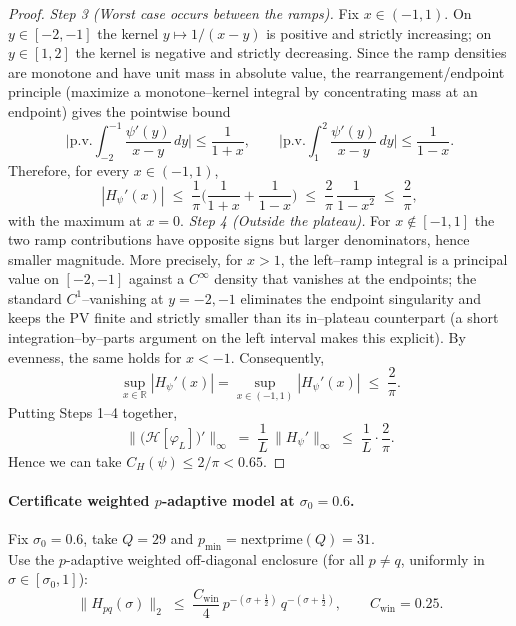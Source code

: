 \documentclass[11pt]{article}
\newif\ifshownumerics
\theoremstyle{definition}
\theoremstyle{remark}
\theoremstyle{definition}
\begin{document}
\begin{proof}
\smallskip
\textit{Step 3 (Worst case occurs between the ramps).} Fix $x\in(-1,1)$.  On $y\in[-2,-1]$ the kernel $y\mapsto 1/(x-y)$ is positive and strictly increasing; on $y\in[1,2]$ the kernel is negative and strictly decreasing.  Since the ramp densities are monotone and have unit mass in absolute value, the rearrangement/endpoint principle (maximize a monotone–kernel integral by concentrating mass at an endpoint) gives the pointwise bound
\[
  \Big|\mathrm{p.v.}\!\int_{-2}^{-1}\frac{\psi'(y)}{x-y}\,dy\Big|
  \le \frac{1}{1+x},\qquad
  \Big|\mathrm{p.v.}\!\int_{1}^{2}\frac{\psi'(y)}{x-y}\,dy\Big|
  \le \frac{1}{1-x}.
\]
Therefore, for every $x\in(-1,1)$,
\[
  |H_\psi'(x)| \;\le\; \frac{1}{\pi}\Big(\frac{1}{1+x}+\frac{1}{1-x}\Big)
  \;\le\; \frac{2}{\pi}\,\frac{1}{1-x^2}
  \;\le\; \frac{2}{\pi},
\]
with the maximum at $x=0$.
\smallskip
\textit{Step 4 (Outside the plateau).} For $x\notin[-1,1]$ the two ramp contributions have opposite signs but larger denominators, hence smaller magnitude. More precisely, for $x>1$, the left–ramp integral is a principal value on $[-2,-1]$ against a $C^\infty$ density that vanishes at the endpoints; the standard $C^1$–vanishing at $y=-2,-1$ eliminates the endpoint singularity and keeps the PV finite and strictly smaller than its in–plateau counterpart (a short integration–by–parts argument on the left interval makes this explicit). By evenness, the same holds for $x<-1$.  Consequently,
\[
  \sup_{x\in\mathbb R}|H_\psi'(x)|=\sup_{x\in(-1,1)}|H_\psi'(x)|\;\le\;\frac{2}{\pi}.
\]
Putting Steps 1–4 together,
\[
  \big\|\big(\mathcal H[\varphi_L]\big)'\big\|_\infty
  \;=\;\frac{1}{L}\,\|H_\psi'\|_\infty
  \;\le\;\frac{1}{L}\cdot\frac{2}{\pi}.
\]
Hence we can take $C_H(\psi)\le 2/\pi < 0.65$.
\end{proof}


\ifshownumerics
\paragraph*{Certificate \textemdash{} weighted \(p\)-adaptive model at \(\sigma_0=0.6\).}
Fix \(\sigma_0=0.6\), take \(Q=29\) and \(p_{\min}=\mathrm{nextprime}(Q)=31\).\\
Use the \(p\)-adaptive weighted off-diagonal enclosure (for all \(p\neq q\), uniformly in \(\sigma\in[\sigma_0,1]\)):
\[
\|H_{pq}(\sigma)\|_2 \;\le\; \frac{C_{\mathrm{win}}}{4}\, p^{-(\sigma+\tfrac12)}\, q^{-(\sigma+\tfrac12)},
\qquad C_{\mathrm{win}}=0.25.
\]
\end{document}
